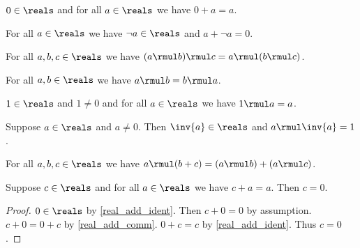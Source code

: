 \begin{axiom}\label{real_add_ident}
    $0\in\reals$ and for all $a\in\reals$ we have $0 + a = a$.
\end{axiom}

\begin{axiom}\label{real_add_inverse}
    For all $a\in\reals$ we have $\neg{a}\in\reals$ and $a + \neg{a} = 0$.
\end{axiom}

\begin{axiom}\label{real_mul_assoc}
    For all $a, b, c\in\reals$ we have $(a \rmul b) \rmul c = a \rmul (b \rmul c)$.
\end{axiom}

\begin{axiom}\label{real_mul_comm}
    For all $a, b\in\reals$ we have $a \rmul b = b \rmul a$.
\end{axiom}

\begin{axiom}\label{real_mul_ident}
    $1\in\reals$ and $1\neq 0$ and for all $a\in\reals$ we have $1 \rmul a = a$.
\end{axiom}

\begin{axiom}\label{real_mul_inverse}
    Suppose $a\in\reals$ and $a\neq 0$.
    Then $\inv{a}\in\reals$ and $a \rmul \inv{a} = 1$.
\end{axiom}

\begin{axiom}\label{real_distrib}
    For all $a, b, c\in\reals$ we have $a \rmul (b + c) = (a \rmul b) + (a \rmul c)$.
\end{axiom}

\begin{theorem}\label{real_add_ident_unique}
    Suppose $c\in\reals$ and for all $a\in\reals$ we have $c + a = a$.
    Then $c = 0$.
\end{theorem}
\begin{proof}
    $0\in\reals$ by \cref{real_add_ident}.
    Then $c + 0 = 0$ by assumption.
    $c + 0 = 0 + c$ by \cref{real_add_comm}.
    $0 + c = c$ by \cref{real_add_ident}.
    Thus $c = 0$.
\end{proof}

